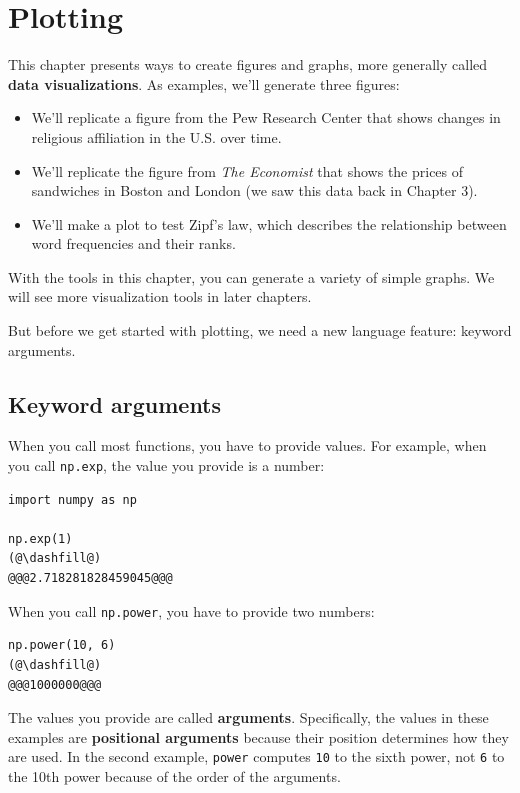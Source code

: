 \hypertarget{plotting}{%
\chapter{Plotting}\label{plotting}}

This chapter presents ways to create figures and graphs, more generally
called \textbf{data visualizations}. As examples, we'll generate three
figures:

\begin{itemize}
\item
  We'll replicate a figure from the Pew Research Center that shows
  changes in religious affiliation in the U.S. over time.
\item
  We'll replicate the figure from \emph{The Economist} that shows the
  prices of sandwiches in Boston and London (we saw this data back in
  Chapter 3).
\item
  We'll make a plot to test Zipf's law, which describes the relationship
  between word frequencies and their ranks.
\end{itemize}

With the tools in this chapter, you can generate a variety of simple
graphs. We will see more visualization tools in later chapters.

But before we get started with plotting, we need a new language feature:
keyword arguments.

\hypertarget{keyword-arguments}{%
\section{Keyword arguments}\label{keyword-arguments}}

When you call most functions, you have to provide values. For example,
when you call \passthrough{\lstinline!np.exp!}, the value you provide is
a number:

\begin{lstlisting}[]
import numpy as np

np.exp(1)
(@\dashfill@)
@@@2.718281828459045@@@
\end{lstlisting}

When you call \passthrough{\lstinline!np.power!}, you have to provide
two numbers:

\begin{lstlisting}[]
np.power(10, 6)
(@\dashfill@)
@@@1000000@@@
\end{lstlisting}

The values you provide are called \textbf{arguments}. Specifically, the
values in these examples are \textbf{positional arguments} because their
position determines how they are used. In the second example,
\passthrough{\lstinline!power!} computes \passthrough{\lstinline!10!} to
the sixth power, not \passthrough{\lstinline!6!} to the 10th power
because of the order of the arguments.

